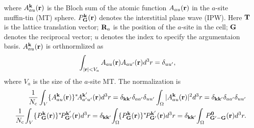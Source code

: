 \documentclass[a4paper,10pt,epsf,fleqn]{article}
\begin{document}
where $A^{\bf k}_{a u}({\bf r})$ is the Bloch sum of
the atomic function $A_{au}({\bf r})$ in the $a$-site muffin-tin (MT) sphere.
$P^{\bf k}_{\bf G}({\bf r})$ denotes the interstitial plane wave (IPW).
Here ${\bf T}$ is the lattice translation vector;
${\bf R}_a$ is the position of the $a$-site in the cell;
${\bf G}$ denotes the reciprocal vector; %
$u$ denotes the index to specify the argumentaion basis. 
$A^{\bf k}_{a u}({\bf r})$ is orthnormlized as
\begin{eqnarray}
\int_{|{\bf r}| < V_a} A_{a u}({\bf r})A_{a u'}({\bf r}) d^3r =\delta_{u u'},
\end{eqnarray}
where $V_a$ is the size of the $a$-site MT.
The normalization is
\begin{eqnarray}
&&
\frac{1}{N_{\rm c}}\int_V \{A^{\bf k}_{a u}({\bf r})\}^* 
\!A^{\bf k'}_{a' u'}({\bf r}) d^3r = 
\delta_{\bf k k'} \delta_{aa'}\delta_{u u'}
\int_\Omega |A^{\bf k}_{a u}({\bf r})|^2 d^3r
= \delta_{\bf k k'} \delta_{aa'}\delta_{u u'} \\
&&\frac{1}{N_{\rm c}}\!
\int_V  \{ P^{\bf k}_{\bf G}({\bf r})\}^*\!
P^{\bf k'}_{\bf G'}({\bf r})  d^3r
= \delta_{\bf k k'}\!
\int_\Omega \!\{ P^{\bf k}_{\bf G}({\bf r}) \}^*\!
P^{\bf k'}_{\bf G'}({\bf r})  d^3r
= \delta_{\bf k k'}\!
\int_\Omega  P^{\bf 0}_{\bf G'-G}({\bf r}) d^3r.
\end{eqnarray}


%

\newpage
\end{document}
